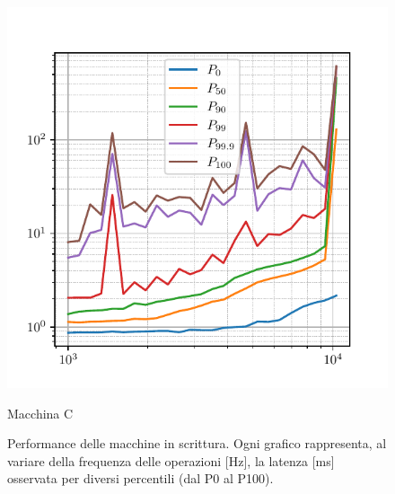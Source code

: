 \begin{figure}[htbp]
    \vspace{0.5cm}
    \begin{minipage}[t]{0.48\textwidth}
        \centering
        \includegraphics[width=\textwidth]{03-risultati/freq-latency/bench-set-h}
        \caption*{Macchina C}
    \end{minipage}

    \caption{Performance delle macchine in scrittura. Ogni grafico rappresenta, al variare della frequenza delle operazioni [Hz], la latenza [ms] osservata per diversi percentili (dal P0 al P100).}
    \label{fig:bench-set}
\end{figure}


